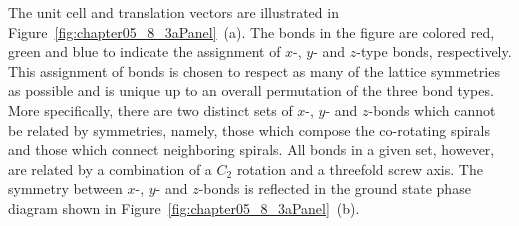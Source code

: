 The unit cell and translation vectors are illustrated in Figure~\ref{fig:chapter05_8_3aPanel}~(a).
The bonds in the figure are colored red, green and blue to indicate the assignment of $x$-, $y$- and $z$-type bonds, respectively.
This assignment of bonds is chosen to respect as many of the lattice symmetries as possible and is unique up to an overall permutation of the three bond types.
More specifically, there are two distinct sets of $x$-, $y$- and $z$-bonds which cannot be related by symmetries, namely, those which compose the co-rotating spirals and those which connect neighboring spirals.
All bonds in a given set, however, are related by a combination of a $C_2$ rotation and a threefold screw axis.
The symmetry between $x$-, $y$- and $z$-bonds is reflected in the ground state phase diagram shown in Figure~\ref{fig:chapter05_8_3aPanel}~(b).


%
%
